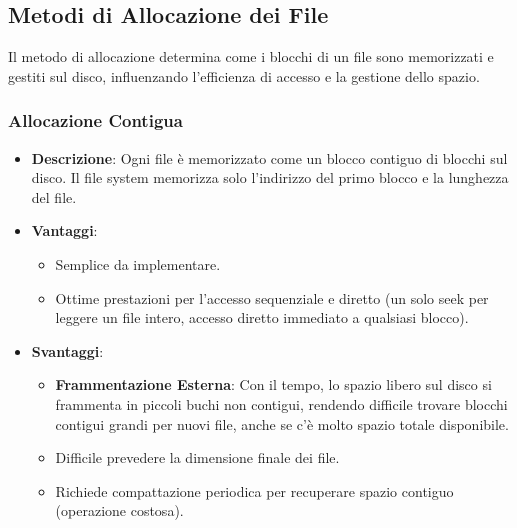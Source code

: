 \subsection{Metodi di Allocazione dei File}
Il metodo di allocazione determina come i blocchi di un file sono memorizzati e gestiti sul disco, influenzando l'efficienza di accesso e la gestione dello spazio.

\subsubsection{Allocazione Contigua}
\begin{itemize}
    \item \textbf{Descrizione}: Ogni file è memorizzato come un blocco contiguo di blocchi sul disco. Il file system memorizza solo l'indirizzo del primo blocco e la lunghezza del file.
    \item \textbf{Vantaggi}:
    \begin{itemize}
        \item Semplice da implementare.
        \item Ottime prestazioni per l'accesso sequenziale e diretto (un solo seek per leggere un file intero, accesso diretto immediato a qualsiasi blocco).
    \end{itemize}
    \item \textbf{Svantaggi}:
    \begin{itemize}
        \item \textbf{Frammentazione Esterna}: Con il tempo, lo spazio libero sul disco si frammenta in piccoli buchi non contigui, rendendo difficile trovare blocchi contigui grandi per nuovi file, anche se c'è molto spazio totale disponibile.
        \item Difficile prevedere la dimensione finale dei file.
        \item Richiede compattazione periodica per recuperare spazio contiguo (operazione costosa).
    \end{itemize}
\end{itemize}

